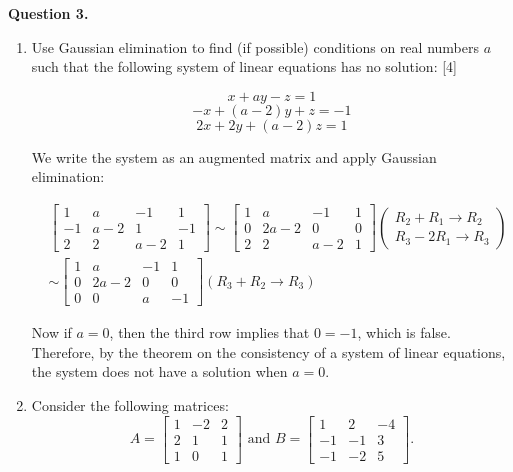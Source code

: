 \documentclass[11pt]{article}
\begin{document}
\textbf{Question 3.}
\begin{enumerate}[label=\alph*)]
    \item Use Gaussian elimination to find (if possible) conditions on real numbers \(a\) such that the following system of linear equations
    has no solution: \hfill [4]

    \[ x + ay - z = 1\]
    \[ -x + (a-2)y + z = -1\]
    \[ 2x + 2y + (a-2)z = 1\]
    
    \color{blue}
    We write the system as an augmented matrix and apply Gaussian elimination:

    \[
    \begin{aligned}
        &\left[
            \begin{array}{ccc|c}
                1 & a & -1 & 1\\
                -1 & a-2 & 1 & -1\\
                2 & 2 & a-2 & 1
            \end{array}
        \right] \sim
        \left[
            \begin{array}{ccc|c}
                1 & a & -1 & 1\\
                0 & 2a-2 & 0 & 0\\
                2 & 2 & a-2 & 1
            \end{array}
        \right]
        \left(
            \begin{array}{c}
             R_2 + R_1 \rightarrow R_2\\
            R_3 - 2R_1 \rightarrow R_3   
            \end{array}
        \right) \\
        &\sim
        \left[
            \begin{array}{ccc|c}
                1 & a & -1 & 1\\
                0 & 2a-2 & 0 & 0\\
                0 & 0 & a & -1
            \end{array}
        \right]
        \left(
            R_3 + R_2 \rightarrow R_3
        \right)
        \end{aligned}
    \]

    Now if \(a = 0\), then the third row implies that \(0 = -1\), which is false.\\
    Therefore, by the theorem on the consistency of a system of linear equations,
    the system does not have a solution when \(a = 0\).
    \color{black}
    \item Consider the following matrices:
    \[
A = \begin{bmatrix}
1 & -2 & 2 \\
2 & 1 & 1 \\
1 & 0 & 1
\end{bmatrix}
\text{ and } 
B = \begin{bmatrix}
    1 & 2 & -4 \\
    -1 & -1 & 3 \\
    -1 & -2 & 5
\end{bmatrix}.
\]


\end{enumerate}
\end{document}
